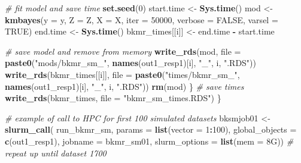 \documentclass[12pt, twoside]{amherstthesis}
\newenvironment{Shaded}{\begin{snugshade}}{\end{snugshade}}
\newcommand{\AttributeTok}[1]{\textcolor[rgb]{0.13,0.29,0.53}{#1}}
\newcommand{\CommentTok}[1]{\textcolor[rgb]{0.56,0.35,0.01}{\textit{#1}}}
\newcommand{\ConstantTok}[1]{\textcolor[rgb]{0.56,0.35,0.01}{#1}}
\newcommand{\DecValTok}[1]{\textcolor[rgb]{0.00,0.00,0.81}{#1}}
\newcommand{\FunctionTok}[1]{\textcolor[rgb]{0.13,0.29,0.53}{\textbf{#1}}}
\newcommand{\NormalTok}[1]{#1}
\newcommand{\OtherTok}[1]{\textcolor[rgb]{0.56,0.35,0.01}{#1}}
\newcommand{\SpecialCharTok}[1]{\textcolor[rgb]{0.81,0.36,0.00}{\textbf{#1}}}
\newcommand{\StringTok}[1]{\textcolor[rgb]{0.31,0.60,0.02}{#1}}
\begin{document}
\begin{Shaded}
\begin{Highlighting}[]
    \CommentTok{\# fit model and save time}
    \FunctionTok{set.seed}\NormalTok{(}\DecValTok{0}\NormalTok{)}
\NormalTok{    start.time }\OtherTok{\textless{}{-}} \FunctionTok{Sys.time}\NormalTok{()}
\NormalTok{    mod }\OtherTok{\textless{}{-}} \FunctionTok{kmbayes}\NormalTok{(}\AttributeTok{y =}\NormalTok{ y, }\AttributeTok{Z =}\NormalTok{ Z, }\AttributeTok{X =}\NormalTok{ X, }
                          \AttributeTok{iter =} \DecValTok{50000}\NormalTok{, }\AttributeTok{verbose =} \ConstantTok{FALSE}\NormalTok{, }\AttributeTok{varsel =} \ConstantTok{TRUE}\NormalTok{)}
\NormalTok{    end.time }\OtherTok{\textless{}{-}} \FunctionTok{Sys.time}\NormalTok{()}
\NormalTok{    bkmr\_times[[i]] }\OtherTok{\textless{}{-}}\NormalTok{ end.time }\SpecialCharTok{{-}}\NormalTok{ start.time}
    
    \CommentTok{\# save model and remove from memory}
    \FunctionTok{write\_rds}\NormalTok{(mod, }\AttributeTok{file =} \FunctionTok{paste0}\NormalTok{(}\StringTok{"mods/bkmr\_sm\_"}\NormalTok{, }\FunctionTok{names}\NormalTok{(out1\_resp1)[i], }\StringTok{"\_"}\NormalTok{, i, }\StringTok{".RDS"}\NormalTok{))}
    \FunctionTok{write\_rds}\NormalTok{(bkmr\_times[[i]], }\AttributeTok{file =} 
                \FunctionTok{paste0}\NormalTok{(}\StringTok{"times/bkmr\_sm\_"}\NormalTok{, }\FunctionTok{names}\NormalTok{(out1\_resp1)[i], }\StringTok{"\_"}\NormalTok{, i, }\StringTok{".RDS"}\NormalTok{))}
    \FunctionTok{rm}\NormalTok{(mod)}
\NormalTok{  \}}
  \CommentTok{\# save times}
  \FunctionTok{write\_rds}\NormalTok{(bkmr\_times, }\AttributeTok{file =} \StringTok{"bkmr\_sm\_times.RDS"}\NormalTok{)}
\NormalTok{\}}

\CommentTok{\# example of call to HPC for first 100 simulated datasets}
\NormalTok{bksmjob01 }\OtherTok{\textless{}{-}} \FunctionTok{slurm\_call}\NormalTok{(}
\NormalTok{  run\_bkmr\_sm, }\AttributeTok{params =} \FunctionTok{list}\NormalTok{(}\AttributeTok{vector =} \DecValTok{1}\SpecialCharTok{:}\DecValTok{100}\NormalTok{),}
  \AttributeTok{global\_objects =} \FunctionTok{c}\NormalTok{(}\StringTok{\textquotesingle{}out1\_resp1\textquotesingle{}}\NormalTok{),}
  \AttributeTok{jobname =} \StringTok{\textquotesingle{}bkmr\_sm01\textquotesingle{}}\NormalTok{,}
  \AttributeTok{slurm\_options =} \FunctionTok{list}\NormalTok{(}\AttributeTok{mem =} \StringTok{\textquotesingle{}8G\textquotesingle{}}\NormalTok{))}
  \CommentTok{\# repeat up until dataset 1700}
\end{Highlighting}
\end{Shaded}
\normalsize
\end{document}
